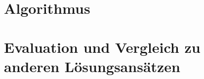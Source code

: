 \documentclass[a4paper, oneside]{scrartcl}
\begin{document}
\section{Algorithmus}
	
	

		



\section{Evaluation und Vergleich zu anderen Lösungsansätzen}
\end{document}
